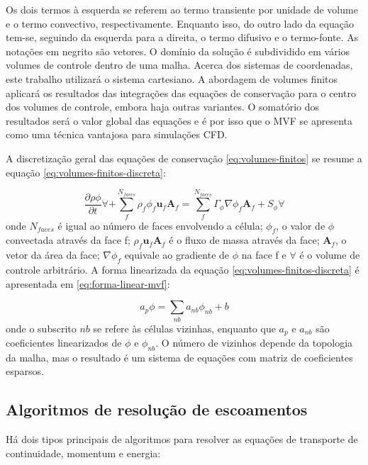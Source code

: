 Os dois termos à esquerda se referem ao termo transiente por unidade de volume e o termo convectivo, respectivamente. Enquanto isso, do outro lado da equação tem-se, seguindo da esquerda para a direita, o termo difusivo e o termo-fonte. As notações em negrito são vetores. O domínio da solução é subdividido em vários volumes de controle dentro de uma malha. Acerca dos sistemas de coordenadas, este trabalho utilizará o sistema cartesiano. A abordagem de volumes finitos aplicará os resultados das integrações das equações de conservação para o centro dos volumes de controle, embora haja outras variantes. O somatório dos resultados será o valor global das equações e é por isso que o MVF se apresenta como uma técnica vantajosa para simulações CFD.

A discretização geral das equações de conservação \ref{eq:volumes-finitos} se resume a equação \ref{eq:volumes-finitos-discreta}:

\begin{equation}
    \label{eq:volumes-finitos-discreta}
    \frac{\partial \rho\phi}{\partial t}\forall + \sum_{f}^{N_{faces}}\rho_{f}\phi_{f}\boldsymbol{u}_f\boldsymbol{A}_{f} = \sum_{f}^{N_{faces}}\Gamma_{\phi}\nabla\phi_{f}\boldsymbol{A}_{f} + S_{\phi}\forall
\end{equation}
%
onde $N_{faces}$ é igual ao número de faces envolvendo a célula; $\phi_f$, o valor de $\phi$ convectada através da face f; $\rho_f\boldsymbol{u}_f\textbf{A}_f$ é o fluxo de massa através da face; $\textbf{A}_f$, o vetor da área da face; $\nabla\phi_f$ equivale ao gradiente de $\phi$ na face f e $\forall$ é o volume de controle arbitrário. A forma linearizada da equação \ref{eq:volumes-finitos-discreta} é apresentada em \ref{eq:forma-linear-mvf}:

\begin{equation}
    \label{eq:forma-linear-mvf}
    a_{p}\phi = \sum_{nb}a_{nb}\phi_{nb} + b
\end{equation}
%
onde o subscrito $nb$ se refere às células vizinhas, enquanto que $a_{p}$ e $a_{nb}$ são coeficientes linearizados de $\phi$ e $\phi_{nb}$. O número de vizinhos depende da topologia da malha, mas o resultado é um sistema de equações com matriz de coeficientes esparsos.

\subsection{Algoritmos de resolução de escoamentos}

Há dois tipos principais de algoritmos para resolver as equações de transporte de continuidade, momentum e energia:

